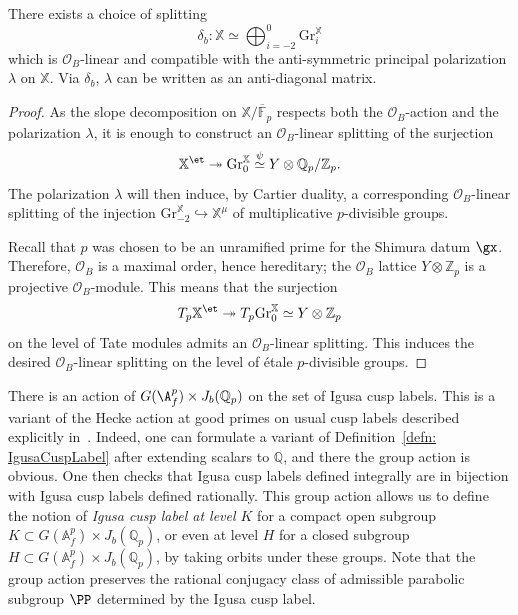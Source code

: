 \documentclass[letterpaper,11pt]{amsart}
\begin{document}
\begin{lemma}\label{lem:splitting anti-diagonal} There exists a choice of splitting 
\[
\delta_b:\mathbb{X}\simeq \bigoplus_{i=-2}^0 \mathrm{Gr}_i^{\mathbb{X}}
\]
which is $\mathcal{O}_B$-linear and compatible with the anti-symmetric principal polarization $\lambda$ on $\mathbb{X}$. Via $\delta_b$, $\lambda$ can be written as an anti-diagonal matrix. 
\end{lemma}

\begin{proof} 
As the slope decomposition on $\mathbb{X} / \overline{\mathbb{F}}_p$ respects both the $\mathcal{O}_B$-action and the polarization $\lambda$, it is enough to construct an $\mathcal{O}_B$-linear splitting of the surjection 
\[
\mathbb{X}^{\et} \twoheadrightarrow \mathrm{Gr}_0^{\mathbb{X}} \stackrel{\psi}{\simeq} Y\otimes \mathbb{Q}_p/\mathbb{Z}_p. 
\]
The polarization $\lambda$ will then induce, by Cartier duality, a corresponding $\mathcal{O}_B$-linear splitting of the injection 
$\mathrm{Gr}^{\mathbb{X}}_{-2} \hookrightarrow \mathbb{X}^{\mu}$
of multiplicative $p$-divisible groups. 

Recall that $p$ was chosen to be an unramified prime for the Shimura datum $\gx$. Therefore, $\mathcal{O}_B$ is a maximal order, hence hereditary; the $\mathcal{O}_B$ lattice $Y\otimes \mathbb{Z}_p$ is a projective $\mathcal{O}_B$-module. This means that the surjection
\[
T_p\mathbb{X}^{\et}\twoheadrightarrow T_p\mathrm{Gr}_0^{\mathbb{X}} \simeq Y\otimes \mathbb{Z}_p
\]
on the level of Tate modules admits an $\mathcal{O}_B$-linear splitting. This induces the desired $\mathcal{O}_B$-linear splitting on the level of \'etale $p$-divisible groups.     
\end{proof}

There is an action of $G(\A_f^p)\times J_b(\mathbb{Q}_p)$ on the set of Igusa cusp labels. This is a variant of the Hecke action at good primes on usual cusp labels described explicitly in~\cite[\S 5.4.3]{lan-thesis}. Indeed, one can formulate a variant of Definition~\ref{defn: IgusaCuspLabel} after extending scalars to $\mathbb{Q}$, and there the group action is obvious. One then checks that Igusa cusp labels defined integrally are in bijection with Igusa cusp labels defined rationally. 
This group action allows us to define the notion of \emph{Igusa cusp label at level $K$} for a compact open subgroup $K\subset G(\mathbb{A}_f^p)\times J_b(\mathbb{Q}_p)$, or even at level $H$ for a closed subgroup $H\subset G(\mathbb{A}_f^p)\times J_b(\mathbb{Q}_p)$, by taking orbits under these groups. Note that the group action preserves the rational conjugacy class of admissible parabolic subgroup $\PP$ determined by the Igusa cusp label. 
\end{document}
